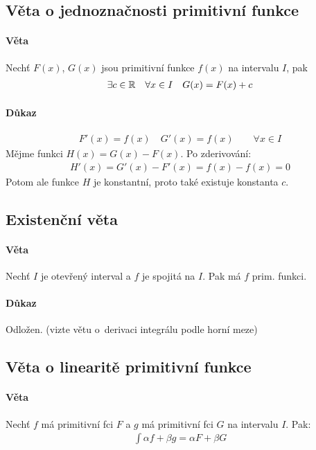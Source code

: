 \documentclass[a4paper,10pt]{article}
\begin{document}
\subsection{Věta o jednoznačnosti primitivní funkce}
\setcounter{equation}{0}
\paragraph{Věta} Nechť $F(x)$, $G(x)$ jsou primitivní funkce $f(x)$ na intervalu $I$, pak 
\begin{align*}
	\exists c \in \mathbb{R} \quad \forall x \in I \quad G(x) = F(x) +c
\end{align*}

\paragraph{Důkaz}
\begin{align}
	F'(x) = f(x) \quad G'(x) = f(x) \qquad \forall x \in I
\end{align}
Mějme funkci $H(x) = G(x) - F(x)$. Po zderivování:
\begin{align}
    H'(x) = G'(x) - F'(x) = f(x) - f(x) = 0
\end{align}
Potom ale funkce $H$ je konstantní, proto také existuje konstanta $c$.

\subsection{Existenční věta}
\paragraph{Věta} Nechť $I$ je otevřený interval a $f$ je spojitá na $I$. Pak má $f$ prim. funkci.
\paragraph{Důkaz} Odložen. (vizte větu o~derivaci integrálu podle horní meze)


\subsection{Věta o linearitě primitivní funkce}
\setcounter{equation}{0}
\paragraph{Věta} Nechť $f$ má primitivní fci $F$ a $g$ má primitivní fci $G$ na intervalu $I$. Pak:
\begin{align*}
	\int \alpha f + \beta g  = \alpha F + \beta G
\end{align*}
\end{document}
